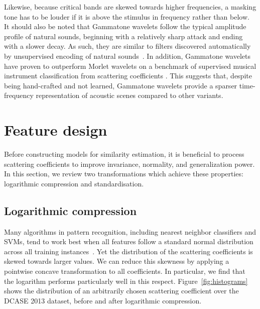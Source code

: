 \documentclass[smallextended]{svjour3}
\begin{document}
Likewise, because critical bands are skewed towards higher frequencies, a masking tone has to be louder if it is above the stimulus in frequency rather than below.
It should also be noted that Gammatone wavelets follow the typical amplitude profile of natural sounds, beginning with a relatively sharp attack and ending with a slower decay.
As such, they are similar to filters discovered automatically by unsupervised encoding of natural sounds~\cite{Smith2006,sainath2015interspeech}.
In addition, Gammatone wavelets have proven to outperform Morlet wavelets on a benchmark of supervised musical instrument classification from scattering coefficients \cite{lostanlen2017phd}.
This suggests that, despite being hand-crafted and not learned, Gammatone wavelets provide a sparser time-frequency representation of acoustic scenes compared to other variants.

\section{Feature design}
\label{sec:design}

Before constructing models for similarity estimation, it is beneficial to process scattering coefficients to improve invariance, normality, and generalization power.
In this section, we review two transformations which achieve these properties: logarithmic compression and standardisation.

\subsection{Logarithmic compression}
\label{sec:logcomp}

Many algorithms in pattern recognition, including nearest neighbor classifiers and SVMs, tend to work best when all features follow a standard normal distribution across all training instances~\cite{Hsu2003}.
Yet the distribution of the scattering coefficients is skewed towards larger values. We can reduce this skewness by applying a pointwise concave transformation to all coefficients. In particular, we find that the logarithm performs particularly well in this respect.
Figure~\ref{fig:histograms} shows the distribution of an arbitrarily chosen scattering coefficient over the DCASE 2013 dataset, before and after logarithmic compression.
\end{document}
